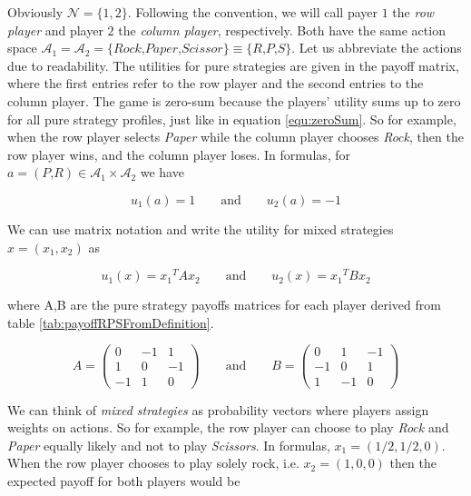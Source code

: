Obviously $\mathcal{N} = \{1,2\}$. Following the convention, we will call payer $1$ the \textit{row player} and player $2$ the \textit{column player}, respectively. Both have the same action space $\mathcal{A}_1 = \mathcal{A}_2 = \{\textit{Rock,Paper,Scissor}\} \equiv \{\textit{R,P,S\}}$. Let us abbreviate the actions due to readability. The utilities for pure strategies are given in the payoff matrix, where the first entries refer to the row player and the second entries to the column player. The game is zero-sum because the players' utility sums up to zero for all pure strategy profiles, just like in equation \ref{equ:zeroSum}. So for example, when the row player selects \textit{Paper} while the column player chooses \textit{Rock}, then the row player wins, and the column player loses. In formulas, for $a = (\textit{P,R}) \in \mathcal{A}_1 \times \mathcal{A}_2$ we have

\begin{equation*}
    u_1(a) = 1 \qquad \text{and} \qquad u_2(a) = -1
\end{equation*}

We can use matrix notation and write the utility for mixed strategies $x = (x_1,x_2)$ as

\begin{equation*}
    u_1(x) = x{_1}^{T}Ax_2 \qquad \text{and} \qquad u_2(x) = x{_1}^{T}Bx_2
\end{equation*}

where A,B are the pure strategy payoffs matrices for each player derived from table \ref{tab:payoffRPSFromDefinition}.

\begin{equation*}
A = \begin{pmatrix}
0 & -1 & 1\\
1 & 0 & -1\\
-1 & 1 & 0
\end{pmatrix}
\qquad \text{and} \qquad
B = \begin{pmatrix}
0 & 1 & -1\\
-1 & 0 & 1\\
1 & -1 & 0
\end{pmatrix}
\end{equation*} 

We can think of \textit{mixed strategies} as probability vectors where players assign weights on actions. So for example, the row player can choose to play \textit{Rock} and \textit{Paper} equally likely and not to play \textit{Scissors}. In formulas, $x_1 = (1/2,1/2,0)$. When the row player chooses to play solely rock, i.e. $x_2 = (1,0,0)$ then the expected payoff for both players would be

